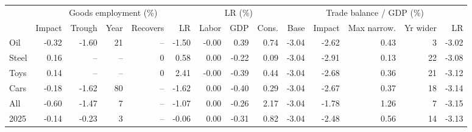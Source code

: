 \begin{tabular}{lrrrrrrrrrrrrr}
\toprule
 & \multicolumn{5}{c}{Goods employment (\%)} & \multicolumn{3}{c}{LR (\%)} & \multicolumn{5}{c}{Trade balance / GDP (\%)} \\
\cmidrule(lr){2-6}\cmidrule(lr){7-9}\cmidrule(lr){10-14}
 & Impact & Trough & Year & Recovers & LR & Labor & GDP & Cons. & Base & Impact & Max narrow. & Yr wider & LR \\
\midrule
Oil & -0.32 & -1.60 & 21 & -- & -1.50 & -0.00 & 0.39 & 0.74 & -3.04 & -2.62 & 0.43 & 3 & -3.02 \\
Steel & 0.16 & -- & -- & 0 & 0.58 & 0.00 & -0.22 & 0.09 & -3.04 & -2.91 & 0.13 & 22 & -3.08 \\
Toys & 0.14 & -- & -- & 0 & 2.41 & -0.00 & -0.39 & 0.44 & -3.04 & -2.68 & 0.36 & 21 & -3.12 \\
Cars & -0.18 & -1.62 & 80 & -- & -1.62 & 0.00 & -0.40 & 0.29 & -3.04 & -2.67 & 0.37 & 18 & -3.14 \\
All & -0.60 & -1.47 & 7 & -- & -1.07 & 0.00 & -0.26 & 2.17 & -3.04 & -1.78 & 1.26 & 7 & -3.15 \\
2025 & -0.14 & -0.23 & 3 & -- & -0.06 & 0.00 & -0.31 & 0.82 & -3.04 & -2.48 & 0.56 & 14 & -3.13 \\
\bottomrule
\end{tabular}
